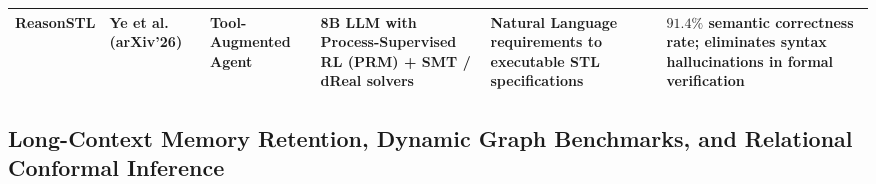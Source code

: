\begin{table}[t]
{\begin{tabular}{llllll}
\midrule
\textbf{ReasonSTL} & Ye et al.~\cite{ye2026reasonstl} (arXiv'26) & Tool-Augmented Agent & 8B LLM with Process-Supervised RL (PRM) + SMT / dReal solvers & Natural Language requirements to executable STL specifications & $91.4\%$ semantic correctness rate; eliminates syntax hallucinations in formal verification \\
\bottomrule
\end{tabular}
}
\end{table}

\subsection{Long-Context Memory Retention, Dynamic Graph Benchmarks, and Relational Conformal Inference}
\label{sec:memory_graphs_conformal}

